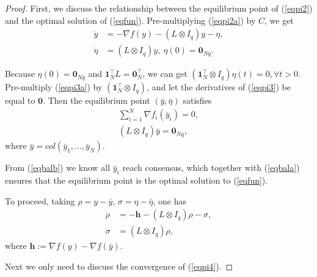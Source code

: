 \documentclass[final,5p,times,twocolumn,authoryear]{elsarticle}
\begin{document}
\begin{proof}
	First, we discuss the relationship between the equilibrium point of (\ref{eqpi2}) and the optimal solution of (\ref{eqfun}). Pre-multiplying (\ref{eqpi2a}) by $C$, we get
	\begin{subequations}\label{eqpi3}
		\begin{align}
			\dot y&=-\nabla f(y)-(L\otimes I_q)y-\eta,\label{eqpi3a}\\
			\dot\eta&=(L\otimes I_q)y,\ \eta(0)=\boldsymbol 0_{Nq}.\label{eqpi3b}
		\end{align}
	\end{subequations}
	
	Because $\eta(0)=\boldsymbol 0_{Nq}$ and $\boldsymbol 1_N^\top L=\boldsymbol0_N^\top $, we can get $(\boldsymbol 1_N^\top \otimes I_q)\eta(t)=0,\forall t>0$. Pre-multiply (\ref{eqpi3a}) by $(\boldsymbol 1_N^\top \otimes I_q)$, and let the derivatives of (\ref{eqpi3}) be equal to $\boldsymbol 0$. Then the equilibrium point $(\bar y,\bar\eta)$ satisfies
	\begin{subequations}
		\begin{align}
			\sum_{i=1}^N \nabla f_i(\bar y_i)=0,\label{eqbala}\\
			(L\otimes I_q)\bar y=\boldsymbol 0_{Nq},\label{eqbalb}
		\end{align}
	\end{subequations}
	where $\bar y=col(\bar y_1, \dots, \bar y_N)$.
	
	From (\ref{eqbalb}) we know all $\bar{y}_i$ reach consensus, which together with (\ref{eqbala}) ensures that the equilibrium point is the optimal solution to (\ref{eqfun}).
	
	To proceed, taking $\rho=y-\bar y$, $\sigma=\eta-\bar\eta$, one has
	\begin{subequations}\label{eqpi4}
		\begin{align}
			\dot{\rho}&=-\boldsymbol h-(L\otimes I_q)\rho-\sigma,\label{eqpi4a}\\
			\dot{\sigma}&=(L\otimes I_q)\rho\label{eqpi4b},
		\end{align}
	\end{subequations}
	where $\boldsymbol h:=\nabla f(y)-\nabla f(\bar y)$.
	
	Next we only need to discuss the convergence of (\ref{eqpi4}).
	

\end{proof}
\end{document}
